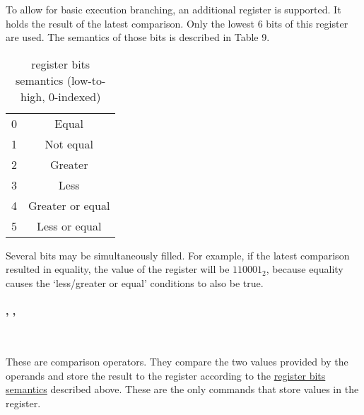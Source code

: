 To allow for basic execution branching, an additional  register
is supported.
It holds the result of the latest comparison.
Only the lowest 6 bits of this register are used.
The semantics of those bits is described in Table 9.

\hypertarget{flags:bits}{}
{
    \vspace{-0.4cm}
    \renewcommand{\arraystretch}{1.4}
    \begin{table}[h!]
        \centering
        \caption{ register bits semantics (low-to-high, 0-indexed)}
        \vspace{2mm}
        \begin{tabular}{| c | c |}
            \hline
            0 & Equal            \\
            1 & Not equal        \\
            2 & Greater          \\
            3 & Less             \\
            4 & Greater or equal \\
            5 & Less or equal    \\
            \hline
        \end{tabular}
    \end{table}
}

Several bits may be simultaneously filled.
For example, if the latest comparison resulted in equality,
the value of the  register will be $110001_2$, because equality
causes the `less/greater or equal' conditions to also be true.

\vspace{-0.35cm}

\paragraph{, , }\

These are comparison operators.
They compare the two values provided by the operands and store the result to
the  register according to the \hyperlink{flags:bits}{
register bits semantics} described above.
These are the only commands that store values in the  register.

